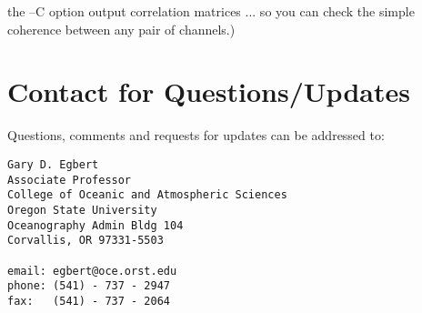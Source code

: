 the --C option output correlation matrices ... so you
can check the simple coherence between any pair of channels.)

\pagebreak

\section{Contact for Questions/Updates}

Questions, comments and requests for updates can be addressed to:

\begin{verbatim}
Gary D. Egbert
Associate Professor
College of Oceanic and Atmospheric Sciences
Oregon State University
Oceanography Admin Bldg 104
Corvallis, OR 97331-5503

email: egbert@oce.orst.edu
phone: (541) - 737 - 2947
fax:   (541) - 737 - 2064
\end{verbatim}


